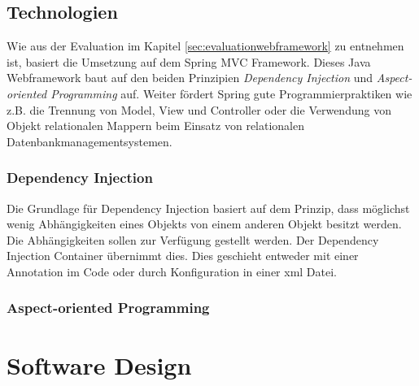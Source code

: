 \subsection{Technologien}
Wie aus der Evaluation im Kapitel \ref{sec:evaluationwebframework} zu entnehmen ist, basiert die Umsetzung auf dem Spring MVC Framework. Dieses Java Webframework baut auf den beiden Prinzipien \textit{Dependency Injection} und \textit{Aspect-oriented Programming} auf. Weiter fördert Spring gute Programmierpraktiken wie z.B. die Trennung von Model, View und Controller oder die Verwendung von Objekt relationalen Mappern beim Einsatz von relationalen Datenbankmanagementsystemen.

\subsubsection{Dependency Injection}

Die Grundlage für Dependency Injection basiert auf dem Prinzip, dass möglichst wenig Abhängigkeiten eines Objekts von einem anderen Objekt besitzt werden. Die Abhängigkeiten sollen zur Verfügung gestellt werden. Der Dependency Injection Container übernimmt dies. Dies geschieht entweder mit einer Annotation im Code oder durch Konfiguration in einer xml Datei.


\subsubsection{Aspect-oriented Programming}



\section{Software Design}

